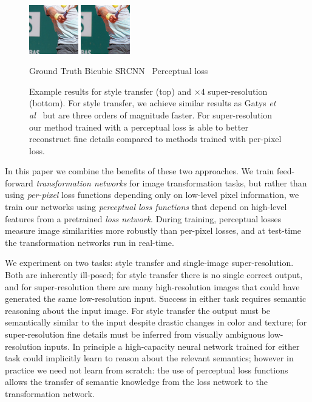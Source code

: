 \documentclass[runningheads]{llncs}
\newcommand{\etal}{\textit{et al}}
\begin{document}
\begin{figure}[t]
\begin{center}
    \includegraphics[width=0.19\textwidth]{3_srcnn.jpg}
    \includegraphics[width=0.19\textwidth]{3_feat.jpg}
  \end{center}
  \vspace{-3mm}
  \hspace{14mm} Ground Truth
  \hspace{7mm} Bicubic
  \hspace{8mm} SRCNN~\cite{dong2014learning}
  \hspace{2mm} Perceptual loss
  \vspace{-1mm}
  \caption{Example results for style transfer (top) and $\times 4$ super-resolution
    (bottom). For style transfer, we achieve similar results as Gatys \etal~\cite{gatys2015neural}
    but are three orders of magnitude faster. For super-resolution our method trained with a
    perceptual loss is able to better reconstruct fine details compared to methods trained with
    per-pixel loss.
  }
  \vspace{-5mm}
\end{figure}

In this paper we combine the benefits of these two approaches.
We train feed-forward \emph{transformation networks} for image transformation tasks,
but rather than using \emph{per-pixel} loss functions depending only on low-level pixel
information, we train our networks using \emph{perceptual loss functions} that depend
on high-level features from a pretrained \emph{loss network}. During training, perceptual
losses measure image similarities more robustly than per-pixel losses, and at test-time
the transformation networks run in real-time.

We experiment on two tasks: style transfer and single-image super-resolution. Both are inherently
ill-posed; for style transfer there is no single correct output, and for super-resolution
there are many high-resolution images that could have generated the same low-resolution input.
Success in either task requires semantic reasoning about the input image. For style
transfer the output must be semantically similar to the input despite drastic changes in color
and texture; for super-resolution fine details must be inferred from visually ambiguous low-resolution
inputs. In principle a high-capacity neural network trained for either task could implicitly learn
to reason about the relevant semantics; however in practice we need not learn from scratch: the
use of perceptual loss functions allows the transfer of semantic knowledge from the loss network to
the transformation network.
\end{document}
